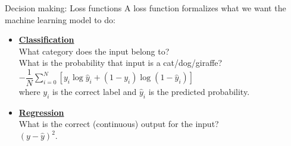 \documentclass[8pt]{beamer}
\begin{document}
	\begin{frame}[t]{Decision making: Loss functions} %
		\vspace{2cm}
		A loss function formalizes what we want the machine learning model to do:\\
		\begin{itemize}
			\item \textbf{\underline{Classification}}\\
			What category does the input belong to?\\
			\rightarrow \hspace{0.2cm} What is the probability that input is a cat/dog/giraffe?\\
			\rightarrow \hspace{0.2cm} $-\dfrac{1}{N}\sum\limits_{i=0}^N \left[ y_i \log \hat{y}_i + (1 - y_i) \log (1 - \hat{y}_i) \right]$\\[0.2cm]
			where $y_i$ is the correct label and $\hat{y}_i$ is the predicted probability.
			\item \textbf{\underline{Regression}}\\
			What is the correct (continuous) output for the input?\\
			\rightarrow \hspace{0.2cm} $\left(y - \hat{y}\right)^2$.
		\end{itemize}
	\end{frame}
\end{document}
